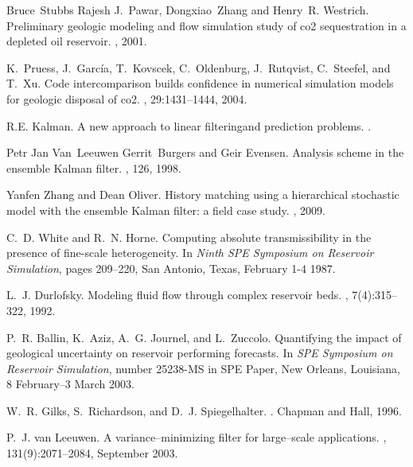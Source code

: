\begin{thebibliography}{10}

Bruce~Stubbs Rajesh J.~Pawar, Dongxiao~Zhang and Henry~R. Westrich.
\newblock Preliminary geologic modeling and flow simulation study of co2
  sequestration in a depleted oil reservoir.
, 2001.

K.~Pruess, J.~Garc{\'{i}}a, T.~Kovscek, C.~Oldenburg, J.~Rutqvist, C.~Steefel,
  and T.~Xu.
\newblock Code intercomparison builds confidence in numerical simulation models
  for geologic disposal of co2.
, 29:1431--1444, 2004.

R.E. Kalman.
\newblock A new approach to linear filteringand prediction problems.
.

Petr Jan Van~Leeuwen Gerrit~Burgers and Geir Evensen.
\newblock Analysis scheme in the ensemble {K}alman filter.
, 126,
  1998.

Yanfen Zhang and Dean Oliver.
\newblock History matching using a hierarchical stochastic model with the
  ensemble {K}alman filter: a field case study.
, 2009.

C.~D. White and R.~N. Horne.
\newblock Computing absolute transmissibility in the presence of fine-scale
  heterogeneity.
\newblock In {\em Ninth SPE Symposium on Reservoir Simulation}, pages 209--220,
  San Antonio, Texas, February 1-4 1987.

L.~J. Durlofsky.
\newblock Modeling fluid flow through complex reservoir beds.
, 7(4):315--322, 1992.

P.~R. Ballin, K.~Aziz, A.~G. Journel, and L.~Zuccolo.
\newblock Quantifying the impact of geological uncertainty on reservoir
  performing forecasts.
\newblock In {\em SPE Symposium on Reservoir Simulation}, number 25238-MS in
  SPE Paper, New Orleans, Louisiana, 8 February--3 March 2003.

W.~R. Gilks, S.~Richardson, and D.~J. Spiegelhalter.
.
\newblock Chapman and Hall, 1996.

P.~J. van Leeuwen.
\newblock A variance--minimizing filter for large--scale applications.
, 131(9):2071--2084, September 2003.


\end{thebibliography}
